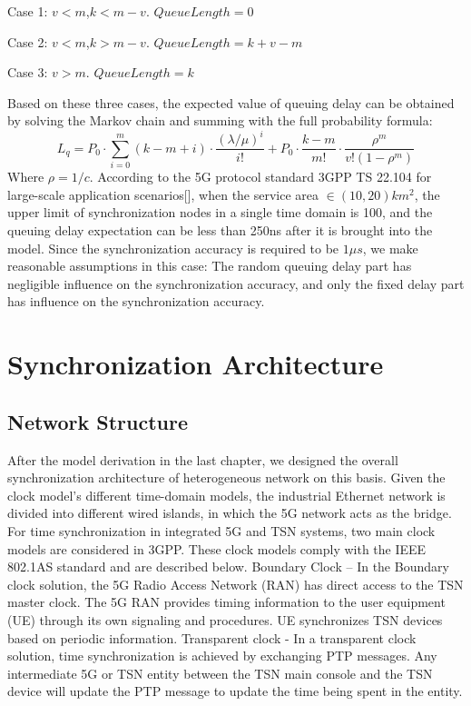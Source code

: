 \documentclass[english]{cccconf}
\begin{document}
Case 1:  $v<m$,$k<m-v$. $QueueLength = 0$

Case 2: $v<m$,$k>m-v$. $QueueLength = k+v-m$

Case 3: $v>m$. $QueueLength = k$

Based on these three cases, the expected value of queuing delay can be obtained by solving the Markov chain and summing with the full probability formula:
\begin{equation}
	L_q=P_0\cdot \sum_{i=0}^m{\left( k-m+i \right) \cdot \frac{\left( \lambda /\mu \right) ^i}{i!}+P_0\cdot \frac{k-m}{m!}\cdot \frac{\rho ^m}{v!\left( 1-\rho ^m \right)}}
\end{equation}
Where $\rho=1/c$. According to the 5G protocol standard 3GPP TS 22.104 for large-scale application scenarios[], when the service area $\in (10,20)km^2$, the upper limit of synchronization nodes in a single time domain is 100, and the queuing delay expectation can be less than 250ns after it is brought into the model. Since the synchronization accuracy is required to be $1\mu s$, we make reasonable assumptions in this case: The random queuing delay part has negligible influence on the synchronization accuracy, and only the fixed delay part has influence on the synchronization accuracy.
\section{Synchronization Architecture}
\subsection{Network Structure}
After the model derivation in the last chapter, we designed the overall synchronization architecture of heterogeneous network on this basis. Given the clock model's different time-domain models, the industrial Ethernet network is divided into different wired islands, in which the 5G network acts as the bridge. For time synchronization in integrated 5G and TSN systems, two main clock models are considered in 3GPP. These clock models comply with the IEEE 802.1AS standard and are described below. Boundary Clock -- In the Boundary clock solution, the 5G Radio Access Network (RAN) has direct access to the TSN master clock. The 5G RAN provides timing information to the user equipment (UE) through its own signaling and procedures. UE synchronizes TSN devices based on periodic information. Transparent clock - In a transparent clock solution, time synchronization is achieved by exchanging PTP messages. Any intermediate 5G or TSN entity between the TSN main console and the TSN device will update the PTP message to update the time being spent in the entity.
\end{document}
